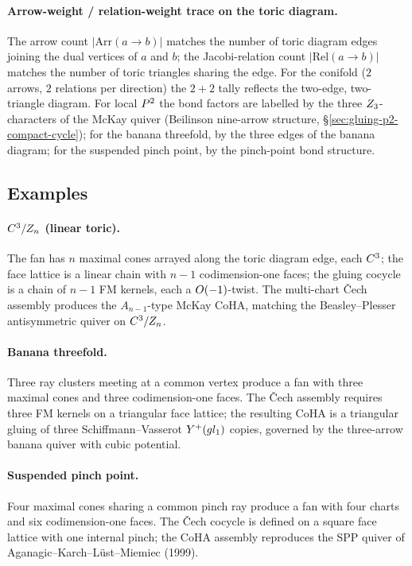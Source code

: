 \paragraph{Arrow-weight / relation-weight trace on the toric diagram.}
The arrow count $|\mathrm{Arr}(a \to b)|$ matches the number of toric
diagram edges joining the dual vertices of $a$ and $b$; the
Jacobi-relation count $|\mathrm{Rel}(a \to b)|$ matches the number of
toric triangles sharing the edge.  For the conifold ($2$ arrows, $2$
relations per direction) the $2 + 2$ tally reflects the two-edge,
two-triangle diagram.  For local $P^2$ the bond factors are labelled
by the three $Z_3$-characters of the McKay quiver (Beilinson nine-arrow
structure, \S\ref{sec:gluing-p2-compact-cycle}); for the banana
threefold, by the three edges of the banana diagram; for the suspended
pinch point, by the pinch-point bond structure.

\subsection{Examples}

\paragraph{$C^3/Z_n$ (linear toric).}
The fan has $n$ maximal cones arrayed along the toric diagram edge, each
$C^3$; the face lattice is a linear chain with $n - 1$ codimension-one
faces; the gluing cocycle is a chain of $n - 1$ FM kernels, each a
$O(-1)$-twist.  The multi-chart \v{C}ech assembly produces the
$A_{n-1}$-type McKay CoHA, matching the Beasley--Plesser antisymmetric
quiver on $C^3/Z_n$.

\paragraph{Banana threefold.}
Three ray clusters meeting at a common vertex produce a fan with three
maximal cones and three codimension-one faces.  The \v{C}ech assembly
requires three FM kernels on a triangular face lattice; the resulting
CoHA is a triangular gluing of three Schiffmann--Vasserot
$Y^+(gl_1)$ copies, governed by the three-arrow banana quiver
with cubic potential.

\paragraph{Suspended pinch point.}
Four maximal cones sharing a common pinch ray produce a fan with four
charts and six codimension-one faces.  The \v{C}ech cocycle is defined on
a square face lattice with one internal pinch; the CoHA assembly
reproduces the SPP quiver of Aganagic--Karch--L\"ust--Miemiec (1999).

